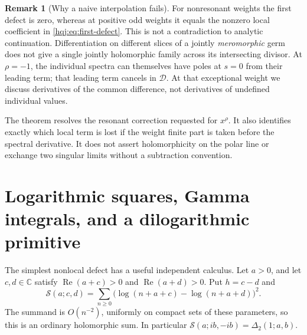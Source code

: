\documentclass[11pt,letterpaper]{article}
\numberwithin{equation}{section}
\theoremstyle{definition}
\newtheorem{remark}[theorem]{Remark}
\newcommand{\Rea}{\operatorname{Re}}
\newcommand{\C}{\mathbb C}
\begin{document}
\begin{remark}[Why a naive interpolation fails]
For nonresonant weights the first defect is zero, whereas at positive
odd weights it equals the nonzero local coefficient in
\eqref{hqj:eq:first-defect}. This is not a contradiction to analytic
continuation. Differentiation on different slices of a jointly
\emph{meromorphic} germ does not give a single jointly holomorphic
family across its intersecting divisor. At $\rho=-1$, the individual
spectra can themselves have poles at $s=0$ from their leading term;
that leading term cancels in $\mathcal D$. At that exceptional weight
we discuss derivatives of the common difference, not derivatives of
undefined individual values.
\end{remark}

The theorem resolves the resonant correction requested for $x^\rho$.
It also identifies exactly which local term is lost if the weight finite
part is taken before the spectral derivative. It does not assert
holomorphicity on the polar line or exchange two singular limits
without a subtraction convention.


\section{Logarithmic squares, Gamma integrals, and a dilogarithmic primitive}
\label{hqj:sec:gamma}

The simplest nonlocal defect has a useful independent calculus.
Let $a>0$, and let $c,d\in\C$ satisfy
$\Rea(a+c)>0$ and $\Rea(a+d)>0$. Put $h=c-d$ and
\begin{equation}\label{hqj:eq:Sdef}
\mathscr S(a;c,d)=\sum_{n\ge0}
\bigl(\log(n+a+c)-\log(n+a+d)\bigr)^2.
\end{equation}
The summand is $O(n^{-2})$, uniformly on compact sets of these
parameters, so this is an ordinary holomorphic sum. In particular
$\mathscr S(a;ib,-ib)=\Delta_2(1;a,b)$.
\end{document}
